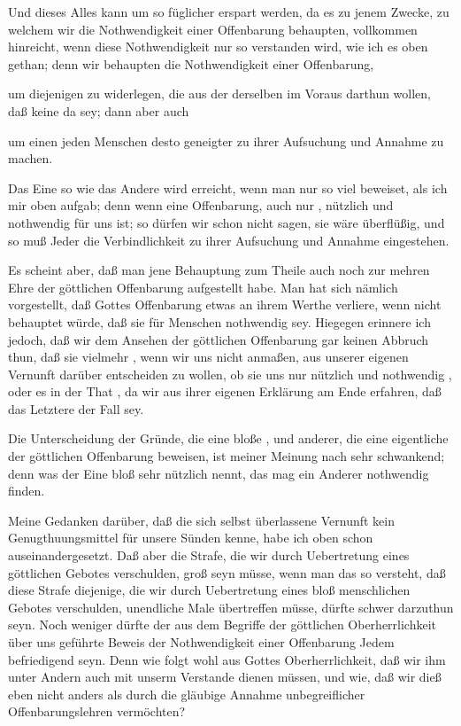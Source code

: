 \begin{aufza}
\begin{aufzb}
\item Und dieses Alles kann um so füglicher erspart werden, da es zu jenem Zwecke, zu welchem wir die Nothwendigkeit einer Offenbarung behaupten, vollkommen hinreicht, wenn diese Nothwendigkeit nur so verstanden wird, wie ich es oben gethan; denn wir behaupten die Nothwendigkeit einer Offenbarung,
\begin{aufzc}
\item um diejenigen zu widerlegen, die aus der  derselben im Voraus darthun wollen, daß keine da sey; dann aber auch
\item um einen jeden Menschen desto geneigter zu ihrer Aufsuchung und Annahme zu machen.
\end{aufzc}
Das Eine so wie das Andere wird erreicht, wenn man nur so viel beweiset, als ich mir oben aufgab; denn wenn eine Offenbarung, auch nur , nützlich und nothwendig für uns ist; so dürfen wir schon nicht sagen, sie wäre überflüßig, und so muß Jeder die Verbindlichkeit zu ihrer Aufsuchung und Annahme eingestehen.
\item Es scheint aber, daß man jene Behauptung zum Theile auch noch zur mehren Ehre der göttlichen Offenbarung aufgestellt habe. Man hat sich nämlich vorgestellt, daß Gottes Offenbarung etwas an ihrem Werthe verliere, wenn nicht behauptet würde, daß sie für  Menschen  nothwendig sey. Hiegegen erinnere ich jedoch, daß wir dem Ansehen der göttlichen Offenbarung gar keinen Abbruch thun, daß sie vielmehr , wenn wir uns nicht anmaßen, aus unserer eigenen Vernunft darüber entscheiden zu wollen, ob sie uns nur nützlich und nothwendig , oder es in der That , da wir aus ihrer eigenen Erklärung am Ende erfahren, daß das Letztere der Fall sey.
\end{aufzb}
\item Die Unterscheidung der Gründe, die eine bloße , und anderer, die eine eigentliche  der göttlichen Offenbarung beweisen, ist meiner Meinung nach sehr schwankend; denn was der Eine bloß sehr nützlich nennt, das mag ein Anderer nothwendig finden.
\item Meine Gedanken darüber, daß die sich selbst überlassene Vernunft kein Genugthuungsmittel für unsere Sünden kenne, habe ich oben schon auseinandergesetzt. Daß aber die Strafe, die wir durch Uebertretung eines göttlichen Gebotes verschulden,  groß seyn müsse, wenn man das so versteht, daß diese Strafe diejenige, die wir durch Uebertretung eines bloß menschlichen Gebotes verschulden, unendliche Male übertreffen müsse, dürfte schwer darzuthun seyn. Noch weniger dürfte der aus dem Begriffe der göttlichen Oberherrlichkeit über uns geführte Beweis der Nothwendigkeit einer Offenbarung Jedem befriedigend seyn. Denn wie folgt wohl aus Gottes Oberherrlichkeit, daß wir ihm unter Andern auch mit unserm Verstande dienen müssen, und wie, daß wir dieß eben nicht anders als durch die gläubige Annahme unbegreiflicher Offenbarungslehren vermöchten?

\end{aufza}
